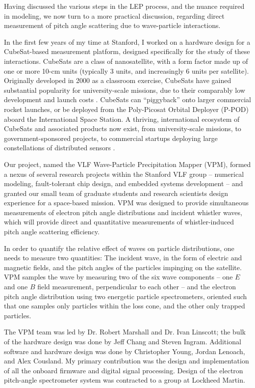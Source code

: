 Having discussed the various steps in the LEP process, and the nuance required in modeling, we now turn to a more practical discussion, regarding direct measurement of pitch angle scattering due to wave-particle interactions. 

In the first few years of my time at Stanford, I worked on a hardware design for a CubeSat-based measurement platform, designed specifically for the study of these interactions. CubeSats are a class of nanosatellite, with a form factor made up of one or more 10-cm units (typically 3 units, and increasingly 6 units per satellite). Originally developed in 2000 as a classroom exercise, CubeSats have gained substantial popularity for university-scale missions, due to their comparably low development and launch costs \citep{Heidt2000}. CubeSats can ``piggyback'' onto larger commercial rocket launches, or be deployed from the Poly-Picosat Orbital Deployer (P-POD) aboard the International Space Station. A thriving, international ecosystem of CubeSats and associated products now exist, from university-scale missions, to government-sponsored projects, to commercial startups deploying large constellations of distributed sensors \citep{Woellert2011, Swartwout2013}.

Our project, named the VLF Wave-Particle Precipitation Mapper (VPM), formed a nexus of several research projects within the Stanford VLF group -- numerical modeling, fault-tolerant chip design, and embedded systems development -- and granted our small team of graduate students and research scientists design experience for a space-based mission. VPM was designed to provide simultaneous measurements of electron pitch angle distributions and incident whistler waves, which will provide direct and quantitative measurements of whistler-induced pitch angle scattering efficiency.

In order to quantify the relative effect of waves on particle distributions, one needs to measure two quantities: The incident wave, in the form of electric and magnetic fields, and the pitch angles of the particles impinging on the satellite. VPM samples the wave by measuring two of the six wave components -- one $E$ and one $B$ field measurement, perpendicular to each other -- and the electron pitch angle distribution using two energetic particle spectrometers, oriented such that one samples only particles within the loss cone, and the other only trapped particles.

The VPM team was led by Dr. Robert Marshall and Dr. Ivan Linscott; the bulk of the hardware design was done by Jeff Chang and Steven Ingram. Additional software and hardware design was done by Christopher Young, Jordan Lenoach, and Alex Cousland. My primary contribution was the design and implementation of all the onboard firmware and digital signal processing. Design of the electron pitch-angle spectrometer system was contracted to a group at Lockheed Martin.

